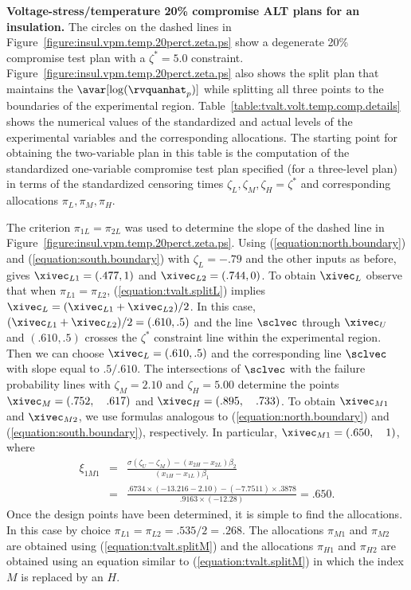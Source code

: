 \begin{example}
{\bf Voltage-stress/temperature 20\% compromise ALT plans for an insulation.} 
\label{example:tvalt.insulation.volt.temp.comp.plans}
The circles on the dashed lines in
Figure~\ref{figure:insul.vpm.temp.20perct.zeta.ps} show a degenerate
20\% compromise test plan with a $\zeta^{*}=5.0$ constraint.
Figure~\ref{figure:insul.vpm.temp.20perct.zeta.ps} also shows the
split plan that maintains the $\avar[\log(\rvquanhat_{p})]$ while
splitting all three points to the boundaries of the experimental
region.  Table~\ref{table:tvalt.volt.temp.comp.details} shows the
numerical values of the standardized and actual levels of the
experimental variables and the corresponding allocations. The
starting point for obtaining the two-variable plan in this table is
the computation of the standardized one-variable compromise test
plan specified (for a three-level plan) in terms of the standardized
censoring times $\zeta_{L},\zeta_{M},\zeta_{H}=\zeta^{*}$ and
corresponding allocations $\pi_{L},\pi_{M},\pi_{H}$.

The criterion $\pi_{1L}=\pi_{2L}$ was used to determine the slope of
the dashed line in
Figure~\ref{figure:insul.vpm.temp.20perct.zeta.ps}. Using
(\ref{equation:north.boundary}) and (\ref{equation:south.boundary})
with $\zeta_{L}=-.79$ and the other inputs as before, gives
$\xivec_{L1}=(.477,1)$ and $\xivec_{L2}=(.744,0)$.  To obtain $\xivec_{L}$
observe that when $\pi_{L1}=\pi_{L2}$, (\ref{equation:tvalt.splitL})
implies $\xivec_{L}=(\xivec_{L1}+ \xivec_{L2})/2$.  In this case,
$(\xivec_{L1}+ \xivec_{L2})/2= (.610,.5)$ and the line $\sclvec$
through $\xivec_{U}$ and $(.610,.5)$ crosses the $\zeta^{*}$
constraint line within the experimental region. Then we can choose
$\xivec_{L}=(.610,.5)$ and the corresponding line $\sclvec$ with
slope equal to $.5/.610$. The intersections of $\sclvec$ with the
failure probability lines with $\zeta_{M}=2.10$ and $\zeta_{H}=5.00$
determine the points $\xivec_{M}=(.752,\quad .617)$ and
$\xivec_{H}=(.895,\quad .733)$.  To obtain $\xivec_{M1}$ and
$\xivec_{M2}$, we use formulas analogous to
(\ref{equation:north.boundary}) and (\ref{equation:south.boundary}),
respectively.  In particular, $\xivec_{M1}=(.650, \quad 1)$, where
\begin{eqnarray*}
\xi_{1M1}&=&\frac{
\sigma (\zeta_{U}-\zeta_{M}) -(x_{2H}-x_{2L})\beta_{2} 
               }
               {
(x_{1H}-x_{1L})\beta_{1} 
               }\\
&=&
\frac{
.6734 \times (-13.216-2.10)- (-7.7511)\times .3878
     }
     {
.9163\times (-12.28)
     }=.650.
\end{eqnarray*}
Once the design points have been determined, it is simple to find
the allocations. In this case by choice
$\pi_{L1}=\pi_{L2}=.535/2=.268$.  The allocations $\pi_{M1}$ and
$\pi_{M2}$ are obtained using (\ref{equation:tvalt.splitM}) and the
allocations $\pi_{H1}$ and $\pi_{H2}$ are obtained using 
an equation similar to (\ref{equation:tvalt.splitM})
in which the index $M$ is replaced by an $H$.


\end{example}
